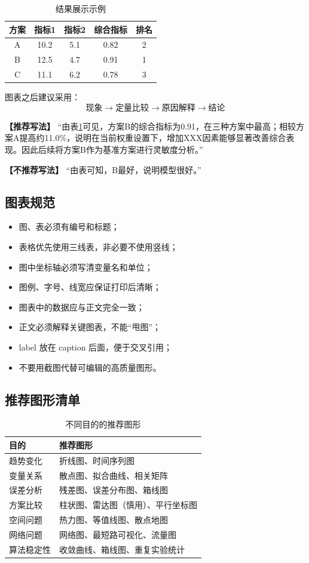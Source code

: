 \documentclass[12pt,a4paper]{article}
\newcommand{\good}[1]{\par\noindent\textbf{【推荐写法】} #1\par}
\newcommand{\bad}[1]{\par\noindent\textbf{【不推荐写法】} #1\par}
\begin{document}
\begin{table}[H]
\centering
\caption{结果展示示例}
\label{tab:result}
\begin{tabular}{ccccc}
\toprule
方案 & 指标1 & 指标2 & 综合指标 & 排名\\
\midrule
A & 10.2 & 5.1 & 0.82 & 2\\
B & 12.5 & 4.7 & 0.91 & 1\\
C & 11.1 & 6.2 & 0.78 & 3\\
\bottomrule
\end{tabular}
\end{table}

图表之后建议采用：
\[
\boxed{\text{现象}\rightarrow\text{定量比较}\rightarrow\text{原因解释}\rightarrow\text{结论}}
\]

\good{“由表\ref{tab:result}可见，方案B的综合指标为0.91，在三种方案中最高；相较方案A提高约11.0\%，说明在当前权重设置下，增加XXX因素能够显著改善综合表现。因此后续将方案B作为基准方案进行灵敏度分析。”}

\bad{“由表可知，B最好，说明模型很好。”}

\subsection{图表规范}
\begin{itemize}
  \item 图、表必须有编号和标题；
  \item 表格优先使用三线表，非必要不使用竖线；
  \item 图中坐标轴必须写清变量名和单位；
  \item 图例、字号、线宽应保证打印后清晰；
  \item 图表中的数据应与正文完全一致；
  \item 正文必须解释关键图表，不能“甩图”；
  \item label 放在 caption 后面，便于交叉引用；
  \item 不要用截图代替可编辑的高质量图形。
\end{itemize}

\subsection{推荐图形清单}
\begin{table}[H]
\centering
\caption{不同目的的推荐图形}
\begin{tabular}{p{4cm}p{8.5cm}}
\toprule
目的 & 推荐图形 \\
\midrule
趋势变化 & 折线图、时间序列图 \\
变量关系 & 散点图、拟合曲线、相关矩阵 \\
误差分析 & 残差图、误差分布图、箱线图 \\
方案比较 & 柱状图、雷达图（慎用）、平行坐标图 \\
空间问题 & 热力图、等值线图、散点地图 \\
网络问题 & 网络图、最短路可视化、流量图 \\
算法稳定性 & 收敛曲线、箱线图、重复实验统计 \\
\bottomrule
\end{tabular}
\end{table}
\end{document}
